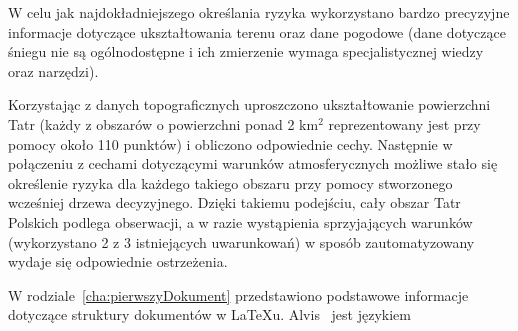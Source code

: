 W celu jak najdokładniejszego określania ryzyka wykorzystano bardzo precyzyjne informacje dotyczące ukształtowania terenu oraz dane pogodowe (dane dotyczące śniegu nie są ogólnodostępne i ich zmierzenie wymaga specjalistycznej wiedzy oraz narzędzi). 

Korzystając z danych topograficznych uproszczono ukształtowanie powierzchni Tatr (każdy z obszarów  o powierzchni ponad 2 km$^2$ reprezentowany jest przy pomocy około 110 punktów) i obliczono odpowiednie cechy. Następnie w połączeniu z cechami dotyczącymi warunków atmosferycznych możliwe stało się określenie ryzyka dla każdego takiego obszaru przy pomocy stworzonego wcześniej drzewa decyzyjnego. Dzięki takiemu podejściu, cały obszar Tatr Polskich podlega obserwacji, a w razie wystąpienia sprzyjających warunków (wykorzystano 2 z 3 istniejących uwarunkowań) w sposób zautomatyzowany wydaje się odpowiednie ostrzeżenia.



W rodziale~\ref{cha:pierwszyDokument} przedstawiono podstawowe informacje dotyczące struktury dokumentów w \LaTeX u. Alvis~\cite{Alvis2011} jest językiem 


















